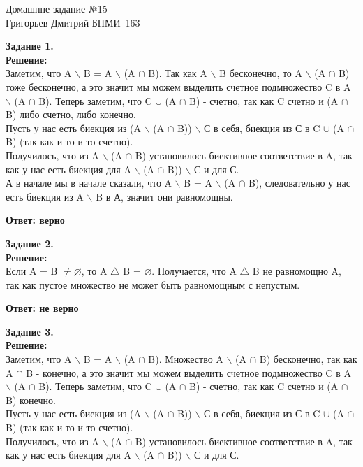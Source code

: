 \documentclass[12pt,a4paper]{scrartcl}
\begin{document}
	\begin{center}	
		Домашнне задание №15 \\
		Григорьев Дмитрий БПМИ--163
	\end{center}
	\textbf{Задание 1.} \\	
	\textbf{Решение:}
	\\Заметим, что A $\backslash$ B = A $\backslash$ (A $\cap$ B). Так как A $\backslash$ B бесконечно, то A $\backslash$ (A $\cap$ B) тоже бесконечно, а это значит мы можем выделить счетное подмножество C в A $\backslash$ (A $\cap$ B). Теперь заметим, что 
	C $\cup$ (A $\cap$ B) - счетно, так как C счетно и (A $\cap$ B) либо счетно, либо конечно. \\
	Пусть у нас есть биекция из  (A $\backslash$ (A $\cap$ B)) $\backslash$ С в себя, биекция из С в C $\cup$ (A $\cap$ B) (так как и то и то счетно). \\
	Получилось, что из A $\backslash$ (A $\cap$ B) установилось биективное соответствие в A, так как у нас есть биекция для A $\backslash$ (A $\cap$ B)) $\backslash$ С и для С. \\
	А в начале мы в начале сказали, что A $\backslash$ B = A $\backslash$ (A $\cap$ B), следовательно у нас есть биекция из A $\backslash$ B в А, значит они равномощны.
	\begin{flushright}	
		\textbf{Ответ: верно}
	\end{flushright} 
	\textbf{Задание 2.} 
	\\
	\textbf{Решение:}
		\\Если A = B $\neq \varnothing$, то A $\bigtriangleup$ B = $\varnothing$. Получается, что A $\bigtriangleup$ B не равномощно A, так как пустое множество не может быть равномощным с непустым.
	\begin{flushright}	
		\textbf{Ответ: не верно}
	\end{flushright}
	\noindent
	\textbf{Задание 3.} 
	\\
	\textbf{Решение:} 
	\\Заметим, что A $\backslash$ B = A $\backslash$ (A $\cap$ B). Множество A $\backslash$ (A $\cap$ B) бесконечно, так как A $\cap$ B - конечно, а это значит мы можем выделить счетное подмножество C в A $\backslash$ (A $\cap$ B). Теперь заметим, что 
	C $\cup$ (A $\cap$ B) - счетно, так как C счетно и (A $\cap$ B) конечно. \\
	Пусть у нас есть биекция из  (A $\backslash$ (A $\cap$ B)) $\backslash$ С в себя, биекция из С в C $\cup$ (A $\cap$ B) (так как и то и то счетно). \\
	Получилось, что из A $\backslash$ (A $\cap$ B) установилось биективное соответствие в A, так как у нас есть биекция для A $\backslash$ (A $\cap$ B)) $\backslash$ С и для С. \\
\end{document}
